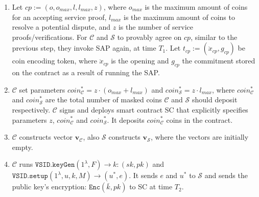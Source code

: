 \begin{enumerate}
\begin{enumerate}
\item Let  $cp:=(o,o_{\scriptscriptstyle max},l,l_{\scriptscriptstyle max},z)$, where $o_{\scriptscriptstyle max}$ is the maximum amount of coins  for an accepting service proof,  $l_{\scriptscriptstyle max}$  is the maximum amount of coins to resolve a potential dispute, and $z$ is the number of  service proofs/verifications. For $\mathcal C$ and $\mathcal S$ to provably agree on $cp$, similar to the previous step, they invoke SAP again, at time $T_{\scriptscriptstyle 1}$.  Let $t_{\scriptscriptstyle cp}:=(\ddot{x}_{\scriptscriptstyle cp},g_{\scriptscriptstyle cp})$ be coin encoding token,  where  $\ddot{x}_{\scriptscriptstyle cp}$ is the opening and $g_{\scriptscriptstyle cp}$ the commitment stored on the contract as a result of running the  SAP. 



\item $\mathcal C$ set parameters  $coin^{\scriptscriptstyle *}_{\scriptscriptstyle\mathcal C}=z\cdot (o_{\scriptscriptstyle max}+l_{\scriptscriptstyle max})$ and $coin^{\scriptscriptstyle *}_{\scriptscriptstyle\mathcal S}=z\cdot l_{\scriptscriptstyle max}$, where $coin^{\scriptscriptstyle *}_{\scriptscriptstyle\mathcal C}$ and $coin^{\scriptscriptstyle *}_{\scriptscriptstyle\mathcal S}$ are   the total number of masked coins $\mathcal C$ and $\mathcal S$ should deposit respectively. $\mathcal C$ signs and deploys  smart contract SC that explicitly specifies  parameters $z$,  $coin^{\scriptscriptstyle *}_{\scriptscriptstyle\mathcal C}$ and $coin^{\scriptscriptstyle *}_{\scriptscriptstyle\mathcal S}$. It deposits $coin^{\scriptscriptstyle *}_{\scriptscriptstyle\mathcal C}$ coins in the contract.


\item $\mathcal C$ constructs  vector $\bm{v}_{\scriptscriptstyle\mathcal C}$, also $\mathcal S$  constructs $\bm{v}_{\scriptscriptstyle\mathcal S}$,  where the vectors are initially empty. 

\item $\mathcal C$ runs  $\mathtt{VSID.keyGen}(1^{\lambda},F)\rightarrow k:(sk,pk)$ and
$\mathtt{VSID.setup}(1^{\lambda}, u,k,M)\rightarrow (u^{\scriptscriptstyle *},e)$.  It sends  $e$ and $u^{\scriptscriptstyle *}$ to $\mathcal S$ and sends  the public key's encryption: $\mathtt{Enc}(\bar{k},pk)$ to SC at time $T_{\scriptscriptstyle 2}$.






\end{enumerate}
\end{enumerate}
